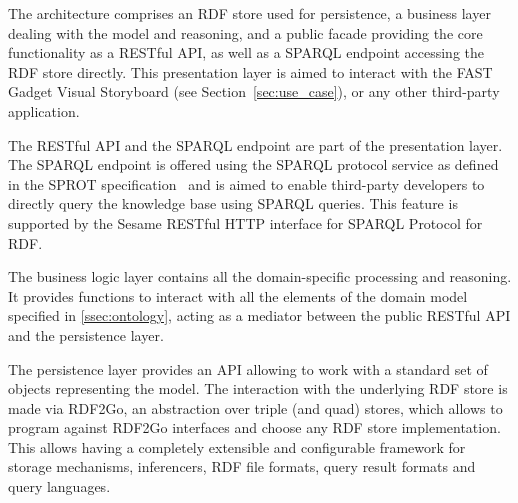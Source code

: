 The architecture comprises an RDF store used for persistence, a business layer dealing with the model and reasoning, and a public facade providing the core functionality as a RESTful API, as well as a SPARQL endpoint accessing the RDF store directly. This presentation layer is aimed to interact with the FAST Gadget Visual Storyboard (see Section~\ref{sec:use_case}), or any other third-party application.

The RESTful API and the SPARQL endpoint are part of the presentation layer. The SPARQL endpoint is offered using the SPARQL protocol service as defined in the SPROT specification~\cite{sprot} and is aimed to enable third-party developers to directly query the knowledge base using SPARQL queries. This feature is supported by the Sesame RESTful HTTP interface for SPARQL Protocol for RDF.

The business logic layer contains all the domain-specific processing and reasoning. It provides functions to interact with all the elements of the domain model specified in \ref{ssec:ontology},
acting as a mediator between the public RESTful API and the persistence layer.

The persistence layer provides an API allowing to work with a standard set of objects representing the model. The interaction with the underlying RDF store is made via RDF2Go, an abstraction over triple (and quad) stores, which allows to program against RDF2Go interfaces and choose any RDF store implementation. This allows having a completely extensible and configurable framework for storage mechanisms, inferencers, RDF file formats, query result formats and query languages.






